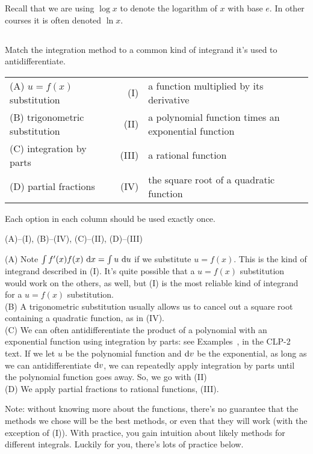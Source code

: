 %
%

\noindent
Recall that we are using $\log x$ to denote the logarithm of $x$ with
base $e$. In other courses it is often denoted $\ln x$.


\subsection*{\Conceptual}
\begin{question}
Match the integration method to a common kind of integrand it's used to antidifferentiate.

\begin{tabular}{lrl}
 (A) $u=f(x)$ substitution & (I)& a function multiplied by its derivative \\
(B) trigonometric substitution & (II) &a polynomial function times an exponential function\\
(C) integration by parts & (III) &a rational function\\
(D) partial fractions & (IV) &the square root of a quadratic function
\end{tabular}
\end{question}
\begin{hint}
Each option in each column should be used exactly once.
\end{hint}
\begin{answer}
(A)--(I),\qquad
(B)--(IV),\qquad
(C)--(II),\qquad
(D)--(III)
\end{answer}
\begin{solution}
(A) Note $\int f'(x)f(x)\ \dee{x} = \int u\ \dee{u} $ if we substitute $u=f(x)$. This is the kind of integrand described in (I). It's quite possible that a $u=f(x)$ substitution would work on the others, as well, but (I) is the most reliable kind of integrand for a $u=f(x)$ substitution.\\
(B) A trigonometric substitution usually allows us to cancel out a square root containing a quadratic function, as in (IV).\\
(C) We can often antidifferentiate the product of a polynomial with an exponential function using integration by parts: see Examples~, 
 in the CLP-2 text. If we let $u$ be the polynomial function and $\mathrm{d}v$ be the exponential, as long as we can antidifferentiate $\mathrm{d}v$, we can repeatedly apply integration by parts until the polynomial function goes away. So, we go with (II)\\
(D) We apply partial fractions to rational functions, (III).

Note: without knowing more about the functions, there's no guarantee that the methods we chose will be the best methods, or even that they will work (with the exception of (I)).  With practice, you gain intuition about likely methods for different integrals. Luckily for you, there's lots of practice below.
\end{solution}
